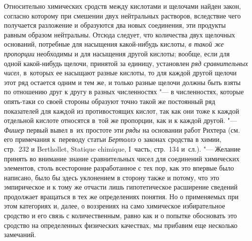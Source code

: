 Относительно химических сродств между кислотами и щелочами найден закон,
согласно которому при смешении двух нейтральных растворов, вследствие чего
получается разложение и образуются два новых соединения, эти продукты равным
образом нейтральны. Отсюда следует, что количества двух щелочных оснований,
потребные для насыщения какой-нибудь кислоты, {\em в такой же пропорции}
необходимы и для насыщения другой кислоты; вообще, если для одной какой-нибудь
щелочи, принятой за единицу, установлен {\em ряд сравнительных чисел},
в~которых ее насыщают разные кислоты, то для каждой другой щелочи этот ряд
остается одним и тем же, и только разные щелочи должны быть взяты по отношению
друг к другу в разных численностях "--- в численностях, которые опять-таки со
своей стороны образуют точно такой же постоянный ряд показателей для каждой из
противостоящих кислот, так как они тоже к каждой отдельной кислоте относятся
в~той же пропорции, как и к каждой другой. "--- {\em Фишер} первый вывел
в~их простоте эти {\em ряды} на основании работ Рихтера (см. его примечания
к~переводу статьи {\em Бертоллэ} о законах сродства в химии, стр.~232 и
Ber\-thol\-let, Sta\-tique chi\-mique, I~часть, стр.~134 и~сл.). "--- Желание
принять во внимание знание сравнительных чисел для соединений химических
элементов, столь всесторонне разработанное с тех пор, как это впервые было
написано, было бы здесь уклонением в сторону также и потому, что это
эмпирическое и к тому же отчасти лишь гипотетическое расширение сведений
продолжает вращаться в тех же определениях понятия. Но о применяемых при этом
категориях и, далее, о воззрениях на само химическое избирательное сродство и
его связь с количественным, равно как и о попытке обосновать это сродство на
определенных физических качествах, мы прибавим еще несколько замечаний.

